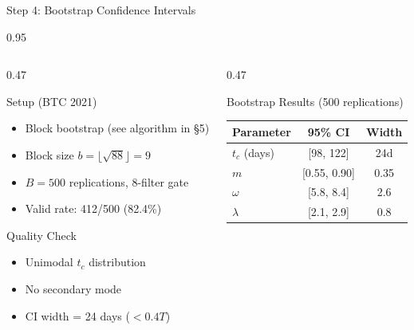 \documentclass[9pt, aspectratio=169, t]{beamer}
\begin{document}
\begin{frame}{Step 4: Bootstrap Confidence Intervals}
    \begin{cminipage}{0.95\textwidth}
    {\scriptsize
    \begin{columns}[T]
        \begin{column}{0.47\textwidth}
            \begin{block}{Setup (BTC 2021)}
                \begin{itemize}\setlength{\itemsep}{1pt}
                    \item Block bootstrap (see algorithm in \S5)
                    \item Block size $b = \lfloor\sqrt{88}\rfloor = 9$
                    \item $B = 500$ replications, 8-filter gate
                    \item Valid rate: 412/500 (82.4\%)
                \end{itemize}
            \end{block}
            \begin{block}{Quality Check}
                \begin{itemize}\setlength{\itemsep}{0pt}
                    \item Unimodal $t_c$ distribution \textcolor{Forest}{\checkmark}
                    \item No secondary mode \textcolor{Forest}{\checkmark}
                    \item CI width = 24 days ($< 0.4T$) \textcolor{Forest}{\checkmark}
                \end{itemize}
            \end{block}
        \end{column}
        \begin{column}{0.47\textwidth}
            \begin{alertblock}{Bootstrap Results (500 replications)}
                {\scriptsize
                \begin{tabular}{lcc}
                    \toprule
                    \textbf{Parameter} & \textbf{95\% CI} & \textbf{Width} \\
                    \midrule
                    $t_c$ (days) & [98, 122] & 24d \\
                    $m$ & [0.55, 0.90] & 0.35 \\
                    $\omega$ & [5.8, 8.4] & 2.6 \\
                    $\lambda$ & [2.1, 2.9] & 0.8 \\

\end{tabular}}
\end{alertblock}
\end{column}
\end{columns}}
\end{cminipage}
\end{frame}
\end{document}
